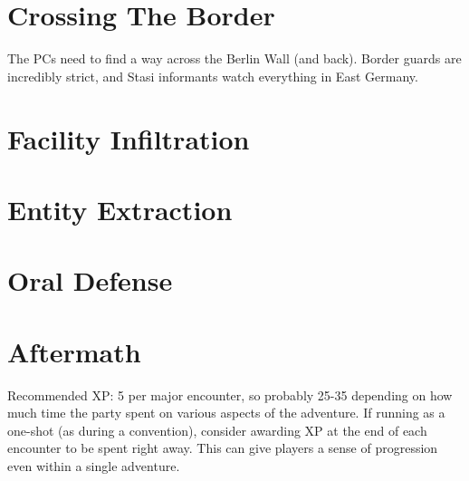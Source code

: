 \documentclass{book}
\begin{document}
\begin{multicols*}{2}
\section{Crossing The Border}

The PCs need to find a way across the Berlin Wall (and back).  Border guards are incredibly strict, and Stasi informants watch everything in East Germany.

\section{Facility Infiltration}

\section{Entity Extraction}

\section{Oral Defense}

\section{Aftermath}

Recommended XP: 5 per major encounter, so probably 25-35 depending on how much time the party spent on various aspects of the adventure.  If running as a one-shot (as during a convention), consider awarding XP at the end of each encounter to be spent right away.  This can give players a sense of progression even within a single adventure.

\end{multicols*}
\end{document}
